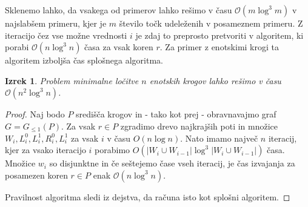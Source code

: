 \documentclass[a4paper, 12pt]{book}
\newcommand{\GG}{\ensuremath{G_{\le 1}}}
\newcommand{\OO}{\ensuremath{\mathcal{O}}} %
\newtheorem{izrek}{Izrek}[chapter]
\begin{document}
Sklenemo lahko, da vsakega od primerov lahko rešimo v času $\OO(m\log^3m)$ v najslabšem primeru, kjer je $m$ število točk udeleženih v posameznem primeru. Z iteracijo čez vse možne vrednosti $i$ je zdaj to preprosto pretvoriti v algoritem, ki porabi $\OO(n\log^3n)$ časa za vsak koren $r$. Za primer z enotskimi krogi ta algoritem izboljša čas splošnega algoritma. 
\begin{izrek}
\label{lema4}
Problem minimalne ločitve $n$ enotskih krogov lahko rešimo v času $\OO(n^2\log^3n)$.
\end{izrek}

\begin{proof}
Naj bodo $P$ središča krogov in - tako kot prej - obravnavajmo graf $G=\GG(P)$. Za vsak $r\in P$ zgradimo drevo najkrajših poti in množice $W_i,L_i^0,L_i^1,R_i^0,L_i^1$ za vsak $i$ v času $O(n\log n)$. Nato imamo največ $n$ iteracij, kjer za vsako iteracijo $i$ porabimo $O(|W_i\cup W_{i-1}|\log^3 |W_i\cup W_{i-1}|)$ časa. Množice $w_i$ so disjunktne in če seštejemo čase vseh iteracij, je čas izvajanja za posamezen koren $r\in P$ enak $\OO(n\log^3n)$.

Pravilnost algoritma sledi iz dejstva, da računa isto kot splošni algoritem.
\end{proof}
\end{document}
